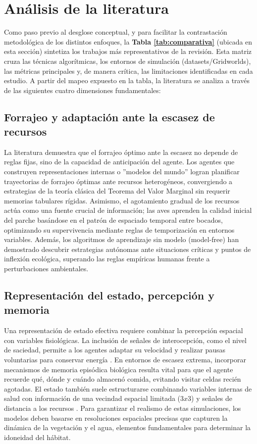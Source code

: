 \documentclass[conference]{IEEEtran}
\begin{document}
\section{Análisis de la literatura}

Como paso previo al desglose conceptual, y para facilitar la contrastación 
metodológica de los distintos enfoques, la 
\textbf{Tabla \ref{tab:comparativa}} (ubicada en esta sección) sintetiza los 
trabajos más representativos de la revisión. Esta matriz cruza las 
técnicas algorítmicas, los entornos de simulación (datasets/Gridworlds), 
las métricas principales y, de manera crítica, las limitaciones 
identificadas en cada estudio. A partir del mapeo expuesto en la tabla, 
la literatura se analiza a través de las siguientes cuatro dimensiones 
fundamentales:

\subsection{Forrajeo y adaptación ante la escasez de recursos}
La literatura demuestra que el forrajeo óptimo ante la escasez no depende de 
reglas fijas, sino de la capacidad de anticipación del agente. Los agentes que 
construyen representaciones internas o ''modelos del mundo'' logran planificar 
trayectorias de forrajeo óptimas ante recursos heterogéneos, convergiendo a 
estrategias de la teoría clásica del Teorema del Valor Marginal sin requerir 
memorias tabulares rígidas. Asimismo, el agotamiento gradual de los recursos 
actúa como una fuente crucial de información; las aves aprenden la calidad 
inicial del parche basándose en el patrón de espaciado temporal entre bocados, 
optimizando su supervivencia mediante reglas de temporización en entornos 
variables. Además, los algoritmos de aprendizaje sin modelo (model-free) han 
demostrado descubrir estrategias autónomas ante situaciones críticas y puntos 
de inflexión ecológica, superando las reglas empíricas humanas frente a 
perturbaciones ambientales.

\subsection{Representación del estado, percepción y memoria}
Una representación de estado efectiva requiere combinar la percepción espacial 
con variables fisiológicas. La inclusión de señales de interocepción, como 
el nivel de saciedad, permite a los agentes adaptar su velocidad y realizar 
pausas voluntarias para conservar energía \cite{Paper1}. En entornos de 
escasez extrema, incorporar mecanismos de memoria episódica biológica resulta 
vital para que el agente recuerde qué, dónde y cuándo almacenó comida, 
evitando visitar celdas recién agotadas. El estado también suele estructurarse 
combinando variables internas de salud con información de una vecindad espacial
limitada ($3 x 3$) y señales de distancia a los recursos \cite{Paper2}. 
Para garantizar el realismo de estas simulaciones, los modelos deben basarse 
en resoluciones espaciales precisas que capturen la dinámica de la vegetación 
y el agua, elementos fundamentales para determinar la idoneidad del hábitat.
\end{document}
